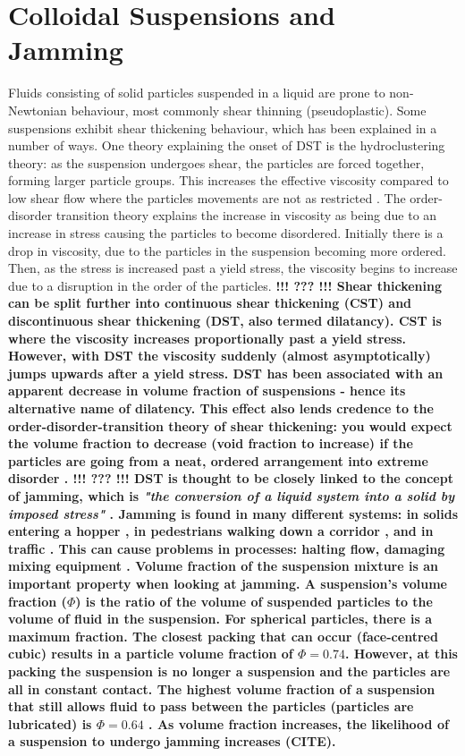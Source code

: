 \documentclass[twoside,a4]{report}
\def\br{\newline \newline \noindent}
\def\cbh{\large\bfseries !!! ??? !!! \normalsize\normalfont}
\begin{document}
	\section{Colloidal Suspensions and Jamming} %
	Fluids consisting of solid particles suspended in a liquid are prone to non-Newtonian behaviour, most commonly shear thinning (pseudoplastic). Some suspensions exhibit shear thickening behaviour, which has been explained in a number of ways. One theory explaining the onset of DST is the hydroclustering theory: as the suspension undergoes shear, the particles are forced together, forming larger particle groups. This increases the effective viscosity compared to low shear flow where the particles movements are not as restricted \cite[p.~7]{backbrownjaegrev}.
	The order-disorder transition  theory explains the increase in viscosity as being due to an increase in stress causing the particles to become disordered. Initially there is a drop in viscosity, due to the particles in the suspension becoming more ordered. Then, as the stress is increased past a yield stress, the viscosity begins to increase due to a disruption in the order of the particles. %
	\cbh \br
	Shear thickening can be split further into continuous shear thickening (CST) and discontinuous shear thickening (DST, also termed dilatancy). CST is where the viscosity increases proportionally past a yield stress. However, with DST the viscosity suddenly (almost asymptotically) jumps upwards after a yield stress. DST has been associated with an apparent decrease in volume fraction of suspensions - hence its alternative name of dilatency. This effect also lends credence to the order-disorder-transition theory of shear thickening: you would expect the volume fraction to decrease (void fraction to increase) if the particles are going from a neat, ordered arrangement into extreme disorder \cite[p.~7]{backbrownjaegrev}. \cbh \br %
	DST is thought to be closely linked to the concept of jamming, which is \textit{"the conversion of a liquid system into a solid by imposed stress"} \cite{backhawjam}. Jamming is found in many different systems: in solids entering a hopper \cite{back2djam}, in pedestrians walking down a corridor \cite{backpedjam}, and in traffic \cite{backcarjam}. This can cause problems in processes: halting flow, damaging mixing equipment \cite{backshearjambertrand}. \br 
	Volume fraction of the suspension mixture is an important property when looking at jamming. A suspension's volume fraction (\( \Phi \)) is the ratio of the volume of suspended particles to the volume of fluid in the suspension. For spherical particles, there is a maximum fraction. The closest packing that can occur (face-centred cubic) results in a particle volume fraction of \( \Phi = 0.74 \). However, at this packing the suspension is no longer a suspension and the particles are all in constant contact. The highest volume fraction of a suspension that still allows fluid to pass between the particles (particles are lubricated) is \( \Phi = 0.64 \) \cite{backguypoonjam}. As volume fraction increases, the likelihood of a suspension to undergo jamming increases (CITE). \br
\end{document}
